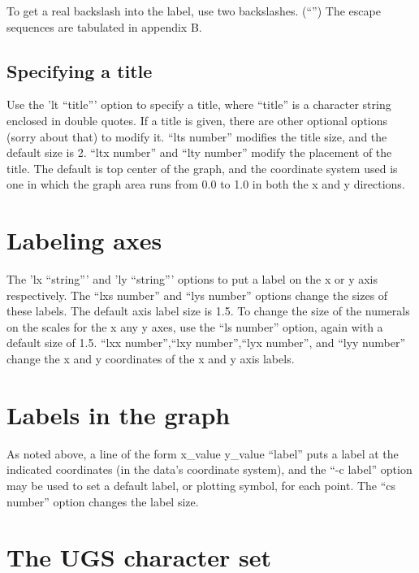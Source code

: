 To get a real backslash into the label, use two backslashes. (``\bs \bs '')
The escape sequences are tabulated in appendix B.

\subsection{Specifying a title}
Use the 'lt ``title''' option to specify a title, where ``title'' is
a character string enclosed in double quotes.  If a title is given,
there are other optional options (sorry about that) to modify it.
``lts number'' modifies the title size, and the default size is 2.
``ltx number'' and ``lty number'' modify the placement of the title.
The default is top center of the graph, and the coordinate system used
is one in which the graph area runs from 0.0 to 1.0 in both the x and
y directions.

\section{Labeling axes}
The 'lx ``string''' and 'ly ``string''' options to put a label on the
x or y axis respectively.  The ``lxs number'' and ``lys number'' options
change the sizes of these labels.  The default axis label size is 1.5.
To change the size of the numerals on the scales for the x any y axes,
use the ``ls number'' option, again with a default size of 1.5.
``lxx number'',``lxy number'',``lyx number'', and ``lyy number'' change the
x and y coordinates of the x and y axis labels.

\section{Labels in the graph}
As noted above, a line of the form
\displaybegin
x\_value    y\_value    ``label''
\displayend
puts a label at the indicated coordinates (in the data's coordinate
system), and the ``-c label'' option may be used to set a default label,
or plotting symbol, for each point.  The ``cs number'' option changes
the label size.

\newpage
\appendix
\section{The UGS character set}

\newpage
